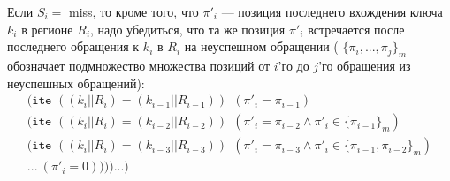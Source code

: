 Если $S_i = $ miss, то кроме того, что $\pi'_i$ --- позиция последнего вхождения ключа $k_i$ в регионе $R_i$, надо убедиться, что та же позиция $\pi'_i$ встречается после последнего обращения к $k_i$ в $R_i$ на неуспешном обращении ( $\{\pi_i, ..., \pi_j\}_m$ обозначает подмножество множества позиций от $i$'го до $j$'го обращения из неуспешных обращений):
$$
\begin{array}{l}
\texttt{(ite~} ((k_i||R_i) = (k_{i-1}||R_{i-1})) ~~ (\pi'_i = \pi_{i-1})\\
\texttt{(ite~} ((k_i||R_i) = (k_{i-2}||R_{i-2})) ~~ (\pi'_i = \pi_{i-2} \wedge \pi'_i \in \{\pi_{i-1}\}_m)\\
\texttt{(ite~} ((k_i||R_i) = (k_{i-3}||R_{i-3})) ~~ (\pi'_i = \pi_{i-3} \wedge \pi'_i \in \{\pi_{i-1}, \pi_{i-2}\}_m)\\
... ~(\pi'_i = 0)\texttt{)))...)}\\
\end{array}
$$

